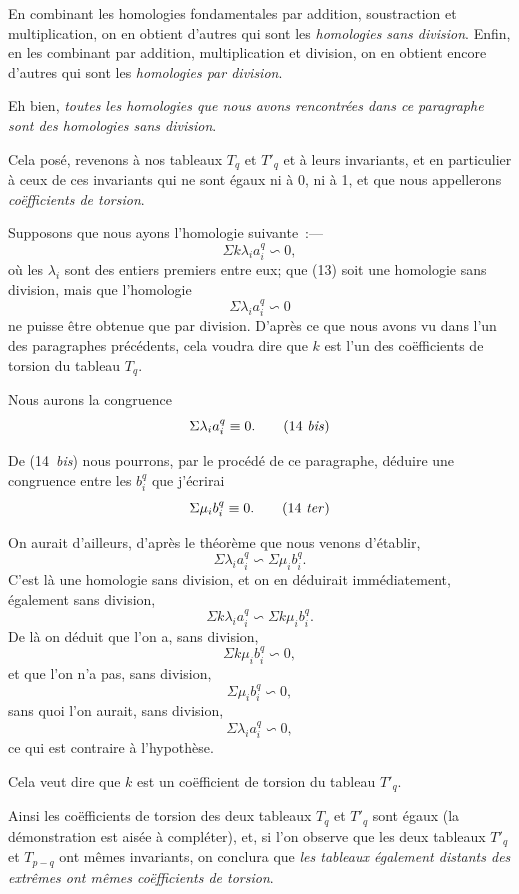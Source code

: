 \documentclass{article}
\begin{document}
En combinant les homologies fondamentales par addition, soustraction et multiplication, on en obtient d'autres qui sont les \emph{homologies sans division}. Enfin, en les combinant par addition, multiplication et division, on en obtient encore d'autres qui sont les \emph{homologies par division}.

Eh bien, \emph{toutes les homologies que nous avons rencontrées dans ce paragraphe sont des homologies sans division}.

Cela posé, revenons à nos tableaux $T_{q}$ et $T'_{q}$ et à leurs invariants, et en particulier à ceux de ces invariants qui ne sont égaux ni à 0, ni à 1, et que nous appellerons \emph{coëfficients de torsion}.

Supposons que nous ayons l'homologie suivante~:---
\[ \Sigma k \lambda_{i} a^{q}_{i} \backsim 0, \tag{13} \]
où les $\lambda_{i}$ sont des entiers premiers entre eux; que (13) soit une homologie sans division, mais que l'homologie
\[ \Sigma \lambda_{i} a^{q}_{i} \backsim 0 \tag{14} \]
ne puisse être obtenue que par division. D'après ce que nous avons vu dans l'un des paragraphes précédents, cela voudra dire que $k$ est l'un des coëfficients de torsion du tableau $T_{q}$.

Nous aurons la congruence
\[ \Sigma \lambda_{i} a^{q}_{i} \equiv 0. \tag{14 \textit{bis}} \]

De (14~\emph{bis}) nous pourrons, par le procédé de ce paragraphe, déduire une congruence entre les $b^{q}_{i}$ que j'écrirai
\[ \Sigma \mu_{i} b^{q}_{i} \equiv 0. \tag{14 \textit{ter}} \]

On aurait d'ailleurs, d'après le théorème que nous venons d'établir,
\[ \Sigma \lambda_{i} a^{q}_{i} \backsim \Sigma \mu_{i} b^{q}_{i}. \]
C'est là une homologie sans division, et on en déduirait immédiatement, également sans division,
\[ \Sigma k \lambda_{i} a^{q}_{i} \backsim \Sigma k \mu_{i} b^{q}_{i}. \]
De là on déduit que l'on a, sans division,
\[ \Sigma k \mu_{i} b^{q}_{i} \backsim 0, \]
et que l'on n'a pas, sans division,
\[ \Sigma \mu_{i} b^{q}_{i} \backsim 0, \]
sans quoi l'on aurait, sans division,
\[ \Sigma \lambda_{i} a^{q}_{i} \backsim 0, \]
ce qui est contraire à l'hypothèse.

Cela veut dire que $k$ est un coëfficient de torsion du tableau $T'_{q}$.

Ainsi les coëfficients de torsion des deux tableaux $T_{q}$ et $T'_{q}$ sont égaux (la démonstration est aisée à compléter), et, si l'on observe que les deux tableaux $T'_{q}$ et $T_{p-q}$ ont mêmes invariants, on conclura que \emph{les tableaux également distants des extrêmes ont mêmes coëfficients de torsion}.
\end{document}
